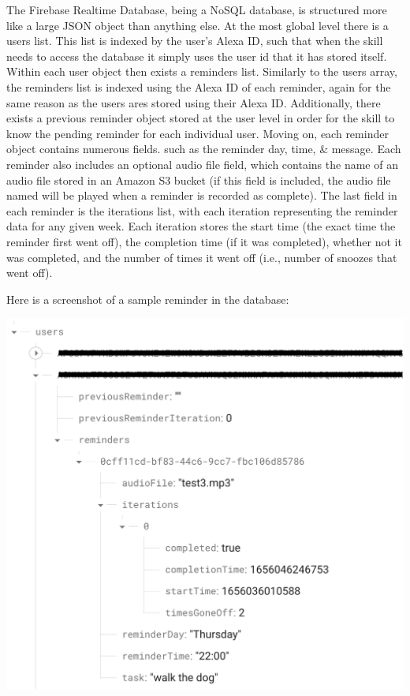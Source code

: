 \documentclass[11pt, oneside]{article}
\begin{document}
The Firebase Realtime Database, being a NoSQL database, is structured more like a large JSON object than anything else. 
At the most global level there is a users list. 
This list is indexed by the user's Alexa ID, such that when the skill needs to access the database it simply uses the user id that it has stored itself. 
Within each user object then exists a reminders list. 
Similarly to the users array, the reminders list is indexed using the Alexa ID of each reminder, again for the same reason as the users ares stored using their Alexa ID. 
Additionally, there exists a previous reminder object stored at the user level in order for the skill to know the pending reminder for each individual user. 
Moving on, each reminder object contains numerous fields. such as the reminder day, time, \& message. 
Each reminder also includes an optional audio file field, which contains the name of an audio file stored in an Amazon S3 bucket (if this field is included, the audio file named will be played when a reminder is recorded as complete).
The last field in each reminder is the iterations list, with each iteration representing the reminder data for any given week. 
Each iteration stores the start time (the exact time the reminder first went off), the completion time (if it was completed), whether not it was completed, and the number of times it went off (i.e., number of snoozes that went off). 

Here is a screenshot of a sample reminder in the database: 
\begin{center}
  \includegraphics[width=\linewidth * 2/3]{images/databaseEx.png}
\end{center}
\end{document}
